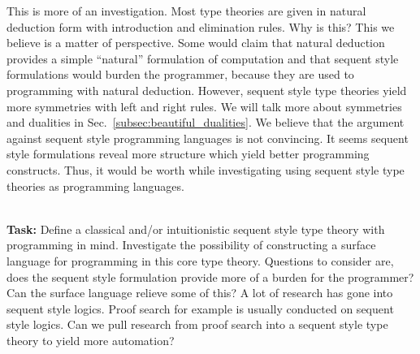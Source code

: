 \begin{openproblem}
  This is more of an investigation.  Most type theories are given in
  natural deduction form with introduction and elimination rules.  Why
  is this?  This we believe is a matter of perspective.  Some would
  claim that natural deduction provides a simple ``natural''
  formulation of computation and that sequent style formulations would
  burden the programmer, because they are used to programming with
  natural deduction.  However, sequent style type theories yield
  more symmetries with left and right rules.  We will talk more about
  symmetries and dualities in Sec.~\ref{subsec:beautiful_dualities}.
  We believe that the argument against sequent style programming
  languages is not convincing.  It seems sequent style formulations
  reveal more structure which yield better programming constructs.
  Thus, it would be worth while investigating using sequent style type
  theories as programming languages.

  \ \\ \textbf{Task:} Define a classical and/or intuitionistic sequent
  style type theory with programming in mind.  Investigate the
  possibility of constructing a surface language for programming in
  this core type theory.  Questions to consider are, does the sequent
  style formulation provide more of a burden for the programmer?  Can
  the surface language relieve some of this?  A lot of research has
  gone into sequent style logics.  Proof search for example is usually
  conducted on sequent style logics.  Can we pull research from proof
  search into a sequent style type theory to yield more automation?
\end{openproblem}

